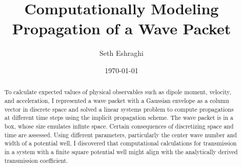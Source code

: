 \documentclass[letterpaper,12pt]{article}
\title{Computationally Modeling Propagation of a Wave Packet}
\author{Seth Eshraghi}
\date{\today}
\begin{document}
    \maketitle
    \thispagestyle{empty}

    \begin{abstract}
        To calculate expected values of physical observables such as dipole
        moment, velocity, and acceleration, I represented a wave packet with a
        Gaussian envelope as a column vector in discrete space and solved a
        linear systems problem to compute propagations at different time steps
        using the implicit propagation scheme. The wave packet is in a box,
        whose size emulates infinte space. Certain consequences of discretizing
        space and time are assessed. Using different parameters, particularly
        the center wave number and width of a potential well, I discovered that
        computational calculations for transmission in a system with a finite
        square potential well might align with the analytically derived
        transmission coefficient.
    \end{abstract}

    \newpage

    \tableofcontents
    \listoffigures

    \newpage

    

    \newpage

    

    \newpage

    
\end{document}
